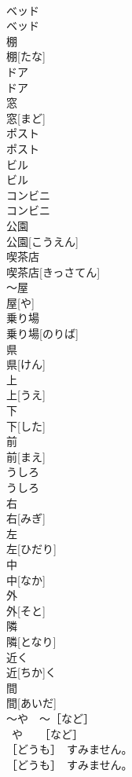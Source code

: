 \documentclass[8pt]{extreport}
\begin{document}
\begin{CJK}{UTF8}{min}
\\	ベッド	
\\	ベッド	
\\	棚	
\\	棚[たな]	
\\	ドア	
\\	ドア	
\\	窓	
\\	窓[まど]	
\\	ポスト	
\\	ポスト	
\\	ビル	
\\	ビル	
\\	コンビニ	
\\	コンビニ	
\\	公園	
\\	公園[こうえん]	
\\	喫茶店	
\\	喫茶店[きっさてん]	
\\	～屋	
\\	屋[や]	
\\	乗り場	
\\	乗り場[のりば]	
\\	県	
\\	県[けん]	
\\	上	
\\	上[うえ]	
\\	下	
\\	下[した]	
\\	前	
\\	前[まえ]	
\\	うしろ	
\\	うしろ	
\\	右	
\\	右[みぎ]	
\\	左	
\\	左[ひだり]	
\\	中	
\\	中[なか]	
\\	外	
\\	外[そと]	
\\	隣	
\\	隣[となり]	
\\	近く	
\\	近[ちか]く	
\\	間	
\\	間[あいだ]	
\\	～や　～［など］	
\\	~や　~［など］	
\\	［どうも］　すみません。	
\\	［どうも］　すみません。	

\end{CJK}
\end{document}
